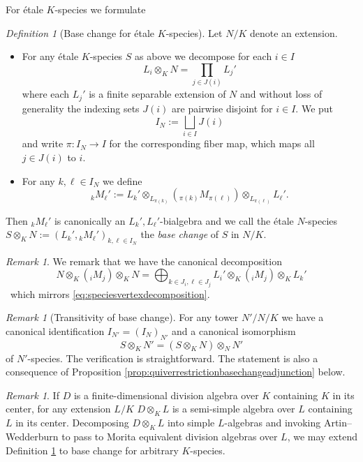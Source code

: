 \documentclass[a4paper,12pt,reqno]{amsart}
\theoremstyle{plain}
\theoremstyle{remark}
\newtheorem{remark}[theorem]{Remark}
\newtheorem{definition}[theorem]{Definition}
\begin{document}
  For \'etale $K$-species we formulate
  \begin{definition}[Base change for \'etale $K$-species]\label{def:basechangeforspecies}
    Let $N/K$ denote an extension.
    \begin{itemize}
      \item[(i)] For any \'etale $K$-species $S$ as above we decompose for each $i\in I$
    \begin{equation}
      L_i\otimes_K N=\prod_{j\in J(i)}L_{j}'
      \label{eq:speciesvertexdecomposition}
    \end{equation}
    where each $L_{j}'$ is a finite separable extension of $N$ and without loss of generality the indexing sets $J(i)$ are pairwise disjoint for $i\in I$. We put
    \[
    I_N:=\bigsqcup_{i\in I}J(i)
    \]
    and write $\pi\colon I_N\to I$ for the corresponding fiber map, which maps all $j\in J(i)$ to $i$.
    \item[(ii)] For any $k,\ell\in I_N$ we define
    \[
      {}_kM_\ell':=
      L_k'\otimes_{L_{\pi(k)}}({}_{\pi(k)}M_{\pi(\ell)})\otimes_{L_{\pi(\ell)}}L_\ell'.
    \]
    \end{itemize}
    Then ${}_kM_\ell'$ is canonically an $L_k',L_\ell'$-bialgebra and we call the \'etale $N$-species $S\otimes_K N:=(L_k',{}_kM_\ell')_{k,\ell\in I_N}$ the {\em base change} of $S$ in $N/K$.
  \end{definition}

  \begin{remark}
    We remark that we have the canonical decomposition
    \begin{equation}
      N\otimes_K({}_iM_j)\otimes_K N=\bigoplus_{k\in J_i,\ell\in J_j}L_i'\otimes_K({}_iM_j)\otimes_KL_k'
      \label{eq:speciesmoduledecomposition}
    \end{equation}\
    which mirrors \eqref{eq:speciesvertexdecomposition}.
  \end{remark}

  \begin{remark}[Transitivity of base change]
    For any tower $N'/N/K$ we have a canonical identification $I_{N'}=(I_N)_{N'}$ and a canonical isomorphism
    \[
    S\otimes_K N'=(S\otimes_K N)\otimes_N N'
    \]
    of $N'$-species. The verification is straightforward. The statement is also a consequence of Proposition \ref{prop:quiverrestrictionbasechangeadjunction} below.
  \end{remark}

  \begin{remark}\label{rmk:simplealgebraspecies}
    If $D$ is a finite-dimensional division algebra over $K$ containing $K$ in its center, for any extension $L/K$ $D\otimes_K L$ is a semi-simple algebra over $L$ containing $L$ in its center. Decomposing $D\otimes_K L$ into simple $L$-algebras and invoking Artin--Wedderburn to pass to Morita equivalent division algebras over $L$, we may extend Definition \ref{def:basechangeforspecies} to base change for arbitrary $K$-species.
  \end{remark}
\end{document}
